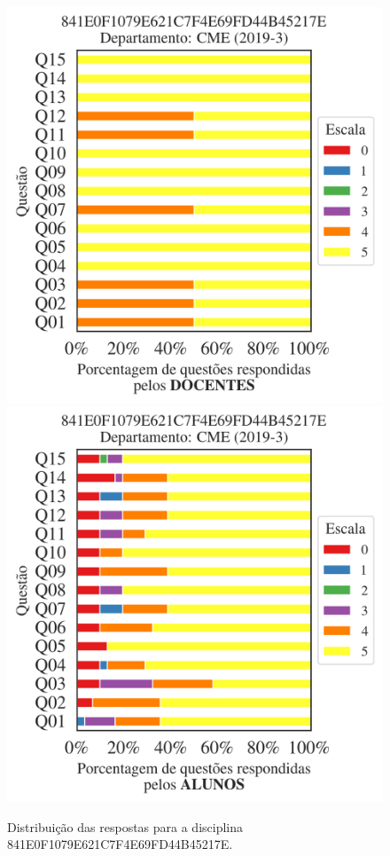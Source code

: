 \documentclass[a4paper,10pt]{article}
\begin{document}
\begin{figure}[h]
\centering
\includegraphics[width=0.485\linewidth]{analise_disciplina_departamento_CME_841E0F1079E621C7F4E69FD44B45217E_docentes.png}
\includegraphics[width=0.485\linewidth]{analise_disciplina_departamento_CME_841E0F1079E621C7F4E69FD44B45217E_alunos.png}
\caption{\label{fig:analise_geral_departamento}                Distribuição das respostas para a disciplina 841E0F1079E621C7F4E69FD44B45217E. }
\end{figure}
\end{document}
